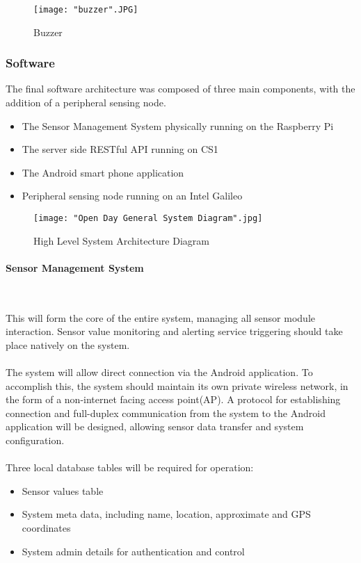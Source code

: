 \documentclass{article}
\begin{document}
\begin{figure}[H]
\centering
\texttt{[image: "buzzer".JPG]}
\caption{Buzzer}
\label{fig:hard_camera}
\end{figure}

\subsubsection{Software}
The final software architecture was composed of three main components, with the addition of a peripheral sensing node.

\begin{itemize}
  \item The Sensor Management System physically running on the Raspberry Pi
  \item The server side RESTful API running on CS1
  \item The Android smart phone application
  \item Peripheral sensing node running on an Intel Galileo 
\end{itemize}


\begin{figure}[h]
\centering
\texttt{[image: "Open Day General System Diagram".jpg]}
\caption{High Level System Architecture Diagram}
\label{overflow}
\end{figure}

\paragraph{Sensor Management System}\

This will form the core of the entire system, managing all sensor module interaction. Sensor value monitoring and alerting service triggering should take place natively on the system. \\\\ The system will allow direct connection via the Android application. To accomplish this, the system should maintain its own private wireless network, in the form of a non-internet facing access point(AP). A protocol for establishing connection and full-duplex communication from the system to the Android application will be designed, allowing sensor data transfer and system configuration. \\\\ Three local database tables will be required for operation:

\begin{itemize}
  \item Sensor values table
  \item System meta data, including name, location, approximate and GPS coordinates 
  \item System admin details for authentication and control
\end{itemize}
\end{document}
